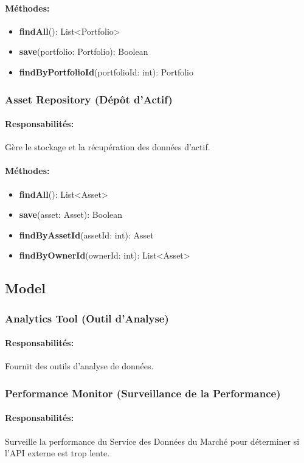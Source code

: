 \documentclass{article}
\begin{document}
\paragraph{Méthodes:}
\begin{itemize}
  \item \textbf{findAll}(): List<Portfolio>
  \item \textbf{save}(portfolio: Portfolio): Boolean
  \item \textbf{findByPortfolioId}(portfolioId: int): Portfolio
\end{itemize}
\subsubsection{Asset Repository (Dépôt d'Actif)}
\paragraph{Responsabilités:} Gère le stockage et la récupération des données d'actif.
\paragraph{Méthodes:}
\begin{itemize}
  \item \textbf{findAll}(): List<Asset>
  \item \textbf{save}(asset: Asset): Boolean
  \item \textbf{findByAssetId}(assetId: int): Asset
  \item \textbf{findByOwnerId}(ownerId: int): List<Asset>
\end{itemize}
\subsection{Model}
\subsubsection{Analytics Tool (Outil d'Analyse)}
\paragraph{Responsabilités:} Fournit des outils d'analyse de données.
\subsubsection{Performance Monitor (Surveillance de la Performance)}
\paragraph{Responsabilités:} Surveille la performance du Service des Données du Marché pour déterminer si l'API externe est trop lente.
\end{document}
